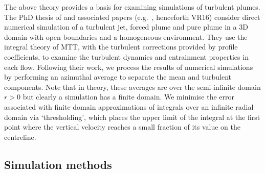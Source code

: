 \documentclass[a4paper]{article}
\begin{document}
The above theory provides a basis for examining simulations of turbulent plumes. The PhD thesis of
\citet{craske} and associated papers (e.g.\ \citet{mvr2016}, henceforth VR16) consider direct numerical
simulation of a turbulent jet, forced plume and pure plume in a 3D domain with open boundaries and a
homogeneous environment.  They use the integral theory of MTT, with the turbulent corrections provided by
profile coefficients, to examine the turbulent dynamics and entrainment properties in each flow. Following
their work, we process the results of numerical simulations by performing an azimuthal average to separate the
mean and turbulent components. Note that in theory, these averages are over the semi-infinite domain $r>0$ but
clearly a simulation has a finite domain. We minimise the error associated with finite domain approximations
of integrals over an infinite radial domain via `thresholding', which places the upper limit of the integral
at the first point where the vertical velocity reaches a small fraction of its value on the centreline.

\subsection{Simulation methods}
\label{sec:setup}
\end{document}
